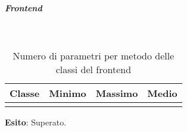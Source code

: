 \subparagraph{Frontend} \mbox{} \\
\begin{center}
\begin{longtable}{| >{\centering}p{7cm} | >{\centering}p{1.8cm} | >{\centering}p{1.8cm} | >{\centering}p{1.8cm} |}
\textbf{Classe} & \textbf{Minimo} & \textbf{Massimo} & \textbf{Medio} \tabularnewline \hline %

\caption{Numero di parametri per metodo delle classi del frontend}
\end{longtable}
\end{center}
\textbf{Esito}: Superato.